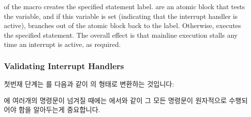 \begin{fcvref}
 of the macro creates the specified statement label.
 are an atomic block that tests
the 
variable, and if this variable is set (indicating that the interrupt
handler is active), branches out of the atomic block back to the
label.
Otherwise,  executes the specified statement.
The overall effect is that mainline execution stalls any time an interrupt
is active, as required.
\end{fcvref}

\fi

\subsubsection{Validating Interrupt Handlers}
\label{sec:formal:Validating Interrupt Handlers}

첫번재 단계는  를 다음과 같이  의
형태로 변환하는 것입니다:

\iffalse

The first step is to convert \co{dyntick_nohz()} to
\co{EXECUTE_MAINLINE()} form, as follows:

\fi



\begin{fcvref}
 에 여러개의 명령문이 넘겨질 때에는
 에서와 같이 그 모든 명령문이 원자적으로
수행되어야 함을 알아두는게 중요합니다.
\end{fcvref}

\iffalse

\begin{fcvref}[ln:formal:promela:dyntick:dyntickRCU-irqnn-ssl:dyntick_nohz]
It is important to note that when a group of statements is passed
to \co{EXECUTE_MAINLINE()}, as in \clnrefrange{stmt2:b}{stmt2:e}, all
statements in that group execute atomically.
\end{fcvref}

\fi

